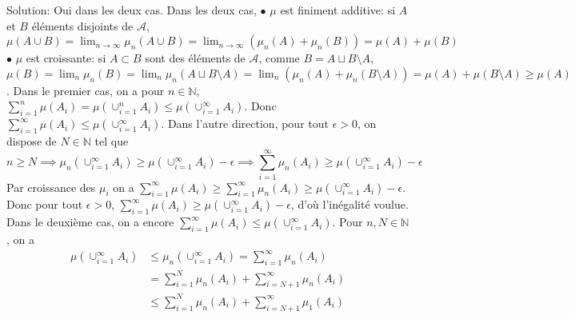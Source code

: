 \documentclass{report}
\begin{document}
\subsection{}  \\

Solution: Oui dans les deux cas. Dans les deux cas, \newline $\bullet$ $\mu$ est finiment additive: si $A$ et $B$ éléments disjoints de $\mathcal A$, $\mu(A\cup B) = \lim_{n\to \infty} \mu_n(A\cup B) =  \lim_{n\to \infty} (\mu_n(A)+\mu_n(B)) =\mu(A) + \mu(B)$\newline
$\bullet$ $\mu$ est croissante: si $A\subset B$ sont des éléments de $\mathcal A$, comme $B=A\sqcup B\setminus A$, $\mu(B) = \lim_n \mu_n(B)  = \lim_n \mu_n(A\sqcup B\setminus A) = \lim_n (\mu_n(A)+ \mu_n(B\setminus A)) = \mu(A)+\mu(B\setminus A) \geq \mu(A)$. \newline \newline
Dans le premier cas, on a pour $n\in \mathbb N$, $\sum_{i=1}^n\mu(A_i) = \mu( \cup_{i=1}^n A_i) \leq \mu( \cup_{i=1}^\infty A_i)$. \newline Donc $\sum_{i=1}^\infty \mu(A_i) \leq \mu( \cup_{i=1}^\infty A_i)$. \newline
Dans l'autre direction, pour tout $\epsilon >0$, on dispose de $N\in \mathbb N$ tel que $$n\geq  N \implies \mu_n(\cup_{i=1}^\infty A_i)\geq \mu(\cup_{i=1}^\infty A_i)-\epsilon \implies \sum_{i=1}^\infty \mu_n(A_i)\geq \mu(\cup_{i=1}^\infty A_i)-\epsilon$$
Par croissance des $\mu_i$ on a $\sum_{i=1}^\infty \mu(A_i) \geq \sum_{i=1}^\infty \mu_n(A_i) \geq \mu(\cup_{i=1}^\infty A_i)-\epsilon$. \newline
Donc pour tout $\epsilon >0$, $\sum_{i=1}^\infty \mu(A_i) \geq \mu(\cup_{i=1}^\infty A_i)-\epsilon$, d'où l'inégalité voulue. \newline \newline
Dans le deuxième cas, on a encore $\sum_{i=1}^\infty \mu(A_i) \leq \mu( \cup_{i=1}^\infty A_i)$. \newline Pour $n, N \in \mathbb N$, on a $$\begin{aligned} \mu(\cup_{i=1}^\infty A_i) &\leq \mu_n(\cup_{i=1}^\infty A_i)  = \sum_{i=1}^\infty \mu_n(A_i)\\ &=\sum_{i=1}^N \mu_n(A_i)  + \sum_{i=N+1}^\infty \mu_n(A_i)\\ &\leq \sum_{i=1}^N \mu_n(A_i)  + \sum_{i=N+1}^\infty \mu_1(A_i) \end{aligned}$$
\end{document}
